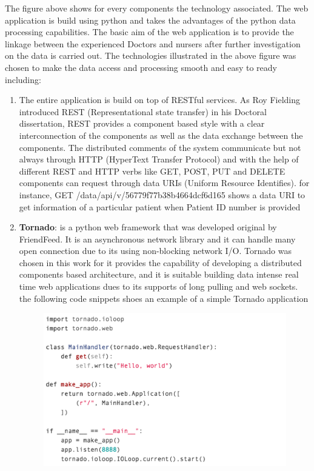 The figure above shows for every components the technology associated. The web application is build using python and takes the advantages of the python data processing capabilities. The basic aim of the web application is to provide the linkage between the experienced Doctors and nursers after further investigation on the data is carried out. The technologies illustrated in the above figure was chosen to make the data access and processing smooth and easy to ready including:
\begin{enumerate}
	\item The entire application is build on top of RESTful services. As Roy Fielding introduced REST (Representational state transfer) in his Doctoral dissertation, REST provides a component based style with a clear interconnection of the components as well as the data exchange between the components. The distributed comments of the system communicate but not always through HTTP (HyperText Transfer Protocol) and with the help of different REST and HTTP verbs like GET, POST, PUT and DELETE components can request through data URIs (Uniform Resource Identifies). for instance, GET /data/api/v/56779f77b38b4664dcf6d165 shows a data URI to get information of a particular patient when Patient ID number is provided\cite{fieldingarchitectural}
	\item {\bfseries Tornado}: is a python web framework that was developed original by FriendFeed. It is an asynchronous network library and it can handle many open connection due to its using non-blocking network I/O. Tornado was chosen in this work for it provides the capability of developing a distributed components based architecture, and it is suitable building data intense real time web applications dues to its supports of long pulling and web sockets. the following code snippets shoes an example of a simple Tornado application
\begin{figure}[H]
\centering
\includegraphics[width=11cm]{images/tornado_sample_app.png} %

\end{figure}
\end{enumerate}
